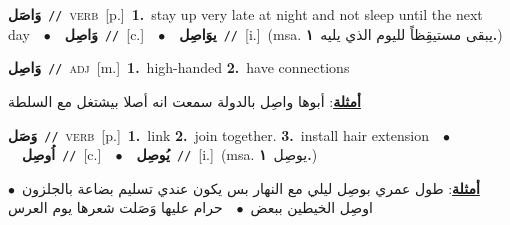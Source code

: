 \documentclass[10pt,a4paper,twoside]{article} %
\begin{document}
\begin{multicols}{2}
{\setlength\topsep{0pt}\textbf{\foreignlanguage{arabic}{وَاصَل}}\ {\color{gray}\texttt{//}\color{black}}\ \textsc{verb}\ [p.]\ \textbf{1.}~stay up very late at night and not sleep until the next day\ \ $\bullet$\ \ \setlength\topsep{0pt}\textbf{\foreignlanguage{arabic}{وَاصِل}}\ {\color{gray}\texttt{//}\color{black}}\ [c.]\ \ $\bullet$\ \ \setlength\topsep{0pt}\textbf{\foreignlanguage{arabic}{يوَاصِل}}\ {\color{gray}\texttt{//}\color{black}}\ [i.]\ \color{gray}(msa. \foreignlanguage{arabic}{يبقى مستيقِظاً لليوم الذي يليه}~\foreignlanguage{arabic}{\textbf{١.}})\color{black}\ } \vspace{2mm}

{\setlength\topsep{0pt}\textbf{\foreignlanguage{arabic}{وَاصِل}}\ {\color{gray}\texttt{//}\color{black}}\ \textsc{adj}\ [m.]\ \textbf{1.}~high-handed  \textbf{2.}~have connections\  \begin{flushright}\color{gray}\foreignlanguage{arabic}{\textbf{\underline{\foreignlanguage{arabic}{أمثلة}}}: أبوها واصِل بالدولة سمعت انه أصلا بيشتغل مع السلطة}\end{flushright}\color{black}} \vspace{2mm}

{\setlength\topsep{0pt}\textbf{\foreignlanguage{arabic}{وَصَل}}\ {\color{gray}\texttt{//}\color{black}}\ \textsc{verb}\ [p.]\ \textbf{1.}~link  \textbf{2.}~join together.  \textbf{3.}~install hair extension\ \ $\bullet$\ \ \setlength\topsep{0pt}\textbf{\foreignlanguage{arabic}{اُوصِل}}\ {\color{gray}\texttt{//}\color{black}}\ [c.]\ \ $\bullet$\ \ \setlength\topsep{0pt}\textbf{\foreignlanguage{arabic}{يُوصِل}}\ {\color{gray}\texttt{//}\color{black}}\ [i.]\ \color{gray}(msa. \foreignlanguage{arabic}{يوصِل}~\foreignlanguage{arabic}{\textbf{١.}})\color{black}\  \begin{flushright}\color{gray}\foreignlanguage{arabic}{\textbf{\underline{\foreignlanguage{arabic}{أمثلة}}}: طول عمري بوصِل ليلي مع النهار بس يكون عندي تسليم بضاعة بالجلزون\ $\bullet$\ \  اوصِل الخيطين ببعض\ $\bullet$\ \  حرام عليها وَصَلت شعرها يوم العرس}\end{flushright}\color{black}} \vspace{2mm}


\end{multicols}
\end{document}
